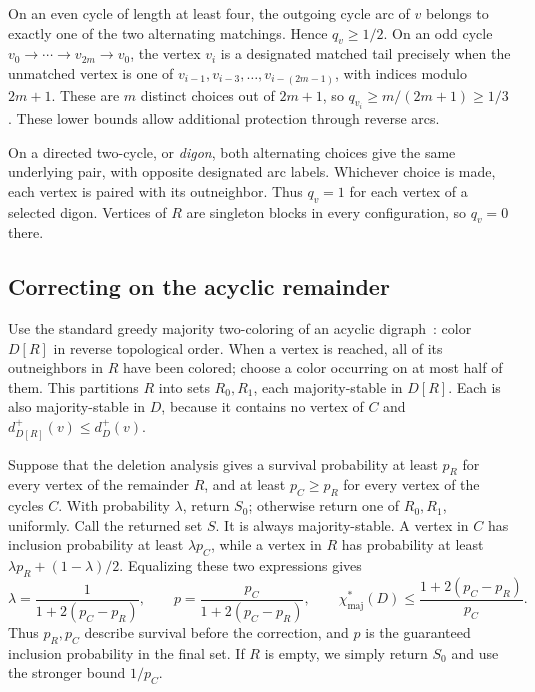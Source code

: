 \documentclass[10pt,a4paper]{article}
\newcommand{\chif}{\chi^*_{\mathrm{maj}}}
\begin{document}
On an even cycle of length at least four, the outgoing cycle arc of \(v\) belongs to exactly one of the two alternating matchings. Hence \(q_v\ge1/2\). On an odd cycle \(v_0\to\cdots\to v_{2m}\to v_0\), the vertex \(v_i\) is a designated matched tail precisely when the unmatched vertex is one of \(v_{i-1},v_{i-3},\ldots,v_{i-(2m-1)}\), with indices modulo \(2m+1\). These are \(m\) distinct choices out of \(2m+1\), so \(q_{v_i}\ge m/(2m+1)\ge1/3\). These lower bounds allow additional protection through reverse arcs.

On a directed two-cycle, or \emph{digon}, both alternating choices give the same underlying pair, with opposite designated arc labels. Whichever choice is made, each vertex is paired with its outneighbor. Thus \(q_v=1\) for each vertex of a selected digon. Vertices of \(R\) are singleton blocks in every configuration, so \(q_v=0\) there.

\subsection{Correcting on the acyclic remainder}
Use the standard greedy majority two-coloring of an acyclic digraph~\cite{KOSZW}: color \(D[R]\) in reverse topological order. When a vertex is reached, all of its outneighbors in \(R\) have been colored; choose a color occurring on at most half of them. This partitions \(R\) into sets \(R_0,R_1\), each majority-stable in \(D[R]\). Each is also majority-stable in \(D\), because it contains no vertex of \(C\) and \(d_{D[R]}^+(v)\le d_D^+(v)\).

Suppose that the deletion analysis gives a survival probability at least \(p_R\) for every vertex of the remainder \(R\), and at least \(p_C\ge p_R\) for every vertex of the cycles \(C\). With probability \(\lambda\), return \(S_0\); otherwise return one of \(R_0,R_1\), uniformly. Call the returned set \(S\). It is always majority-stable. A vertex in \(C\) has inclusion probability at least \(\lambda p_C\), while a vertex in \(R\) has probability at least \(\lambda p_R+(1-\lambda)/2\). Equalizing these two expressions gives
\begin{equation}\label{eq:mixture}
\lambda=\frac{1}{1+2(p_C-p_R)},\qquad
p=\frac{p_C}{1+2(p_C-p_R)},\qquad
\chif(D)\le\frac{1+2(p_C-p_R)}{p_C}.
\end{equation}
Thus \(p_R,p_C\) describe survival before the correction, and \(p\) is the guaranteed inclusion probability in the final set. If \(R\) is empty, we simply return \(S_0\) and use the stronger bound \(1/p_C\).
\end{document}
